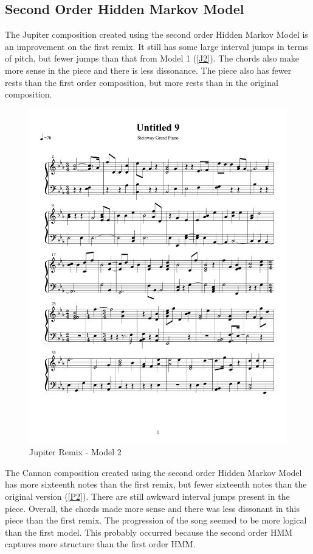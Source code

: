 \documentclass{article} %
\begin{document}
\subsection{Second Order Hidden Markov Model}

The Jupiter composition created using the second order Hidden Markov Model is an improvement on the first remix. It still has some large interval jumps in terms of pitch, but fewer jumps than that from Model 1 (\autoref{J2}). The chords also make more sense in the piece and there is less dissonance. The piece also has fewer rests than the first order composition, but more rests than in the original composition.


\begin{figure}[H]
\centering

\includegraphics [scale = 0.6] {JupiterRemix2-cropped.pdf}
\caption{Jupiter Remix - Model 2\label{J2}}
\end{figure}

The Cannon composition created using the second order Hidden Markov Model has more sixteenth notes than the first remix, but fewer sixteenth notes than the original version ({\autoref{P2}}). There are still awkward interval jumps present in the piece. Overall, the chords made more sense and there was less dissonant in this piece than the first remix. The progression of the song seemed to be more logical than the first model. This probably occurred because the second order HMM captures more structure than the first order HMM.
\end{document}
